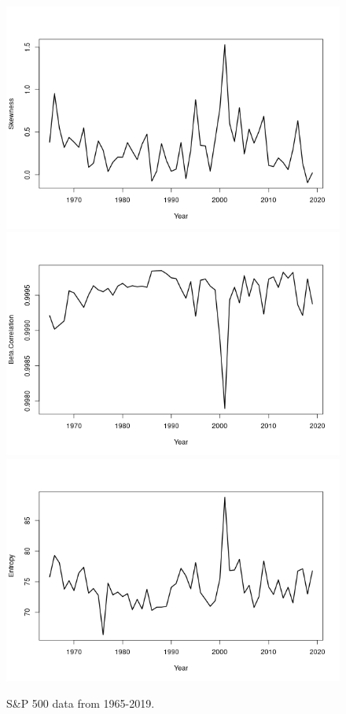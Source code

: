 \documentclass[leqno,12pt]{article}
\begin{document}
{\begin{figure}[htp]
\begin{center}
  \includegraphics[scale=0.33]{img/plot4}
  \includegraphics[scale=0.33]{img/plot5}
  \includegraphics[scale=0.33]{img/plot6}
\end{center}
\caption{S\&P 500 data from 1965-2019.}
\end{figure}


}
\end{document}
